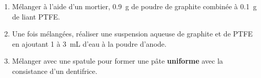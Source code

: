 \documentclass[twoside,a4paper,11pt,addpoints]{exam}%
\begin{document}
\begin{enumerate}
\item Mélanger à l'aide d'un mortier, \SI{0.9}{\gram} de poudre de graphite combinée à \SI{0.1}{\gram} de liant PTFE.
\item Une fois mélangées, réaliser une suspension aqueuse de graphite et de PTFE en ajoutant 1 à \SI{3}{\milli\liter} d'eau à la poudre d'anode.
\item Mélanger avec une spatule pour former une pâte \textbf{uniforme} avec la consistance d'un dentifrice.
\end{enumerate}
\end{document}
